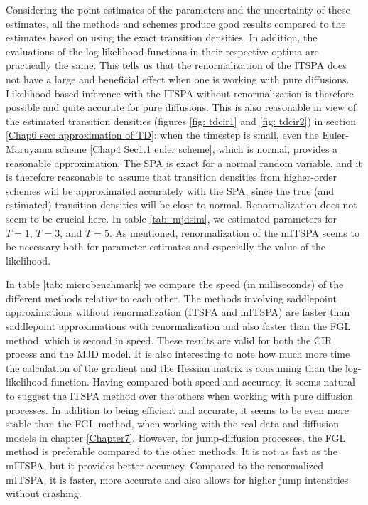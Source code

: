 	Considering the point estimates of the parameters and the uncertainty of these estimates, all the methods and schemes produce good results compared to the estimates based on using the exact transition densities.
	In addition, the evaluations of the log-likelihood functions in their respective optima are practically the same.
	This tells us that the renormalization of the ITSPA does not have a large and beneficial effect when one is working with pure diffusions.
	Likelihood-based inference with the ITSPA without renormalization is therefore possible and quite accurate for pure diffusions.
	This is also reasonable in view of the estimated transition densities (figures \ref{fig: tdcir1} and \ref{fig: tdcir2}) in section \ref{Chap6 sec: approximation of TD}: 
	when the timestep is small, even the Euler-Maruyama scheme \eqref{Chap4 Sec1.1 euler scheme}, which is normal, provides a reasonable approximation.
	The SPA is exact for a normal random variable, and it is therefore reasonable to assume that transition densities from higher-order schemes will be approximated accurately with the SPA, since the true (and estimated) transition densities will be close to normal.
	Renormalization does not seem to be crucial here.
	In table \ref{tab: mjdsim}, we estimated parameters for $T=1$, $T=3$, and $T=5$.
	As mentioned, renormalization of the mITSPA seems to be necessary both for parameter estimates and especially the value of the likelihood.
	
	In table \ref{tab: microbenchmark} we compare the speed (in milliseconds) of the different methods relative to each other.
	The methods involving saddlepoint approximations without renormalization (ITSPA and mITSPA) are faster than saddlepoint approximations with renormalization and also faster than the FGL method, which is second in speed. These results are valid for both the CIR process and the MJD model.
	It is also interesting to note how much more time the calculation of the gradient and the Hessian matrix is consuming than the log-likelihood function.
	Having compared both speed and accuracy, it seems natural to suggest the ITSPA method over the others when working with pure diffusion processes. In addition to being efficient and accurate, it seems to be even more stable than the FGL method, when working with the real data and diffusion models in chapter \ref{Chapter7}.
	However, for jump-diffusion processes, the FGL method is preferable compared to the other methods. It is not as fast as the mITSPA, but it provides better accuracy. Compared to the renormalized mITSPA, it is faster, more accurate and also allows for higher jump intensities without crashing.



